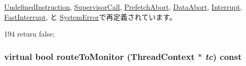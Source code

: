 \hyperlink{classArmISA_1_1UndefinedInstruction_a16facd13ba8e6d15d2b865882c379d5f}{UndefinedInstruction}, \hyperlink{classArmISA_1_1SupervisorCall_a16facd13ba8e6d15d2b865882c379d5f}{SupervisorCall}, \hyperlink{classArmISA_1_1PrefetchAbort_a16facd13ba8e6d15d2b865882c379d5f}{PrefetchAbort}, \hyperlink{classArmISA_1_1DataAbort_a16facd13ba8e6d15d2b865882c379d5f}{DataAbort}, \hyperlink{classArmISA_1_1Interrupt_a16facd13ba8e6d15d2b865882c379d5f}{Interrupt}, \hyperlink{classArmISA_1_1FastInterrupt_a16facd13ba8e6d15d2b865882c379d5f}{FastInterrupt}, と \hyperlink{classArmISA_1_1SystemError_a16facd13ba8e6d15d2b865882c379d5f}{SystemError}で再定義されています。


\begin{DoxyCode}
194 { return false; }
\end{DoxyCode}
\hypertarget{classArmISA_1_1ArmFault_af62e0649938431df8cfab96f0e3fb0a1}{
\subsubsection[{routeToMonitor}]{\setlength{\rightskip}{0pt plus 5cm}virtual bool routeToMonitor ({\bf ThreadContext} $\ast$ {\em tc}) const}}
\label{classArmISA_1_1ArmFault_af62e0649938431df8cfab96f0e3fb0a1}


